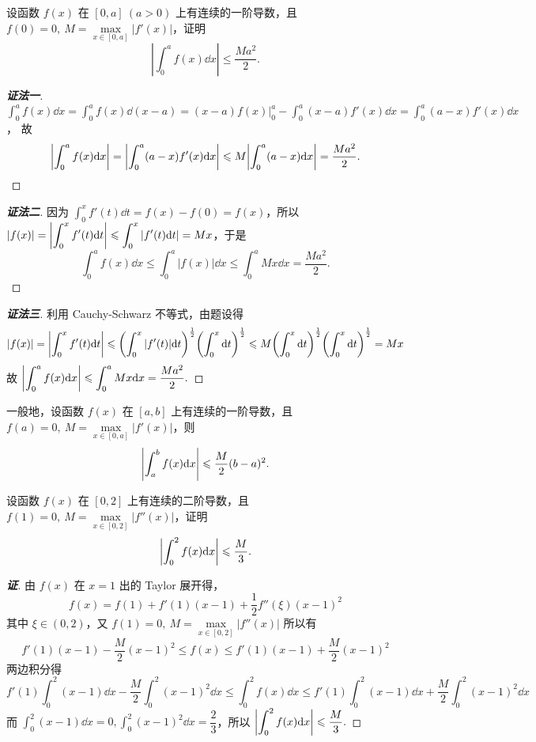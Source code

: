 \begin{example}
    设函数 $f(x)$ 在 $[0,a]~(a>0)$ 上有连续的一阶导数，且 $f(0)=0,~M=\max\limits_{x\in[0,a]}|f'(x)|$，证明 $$\displaystyle\left|\int_{0}^{a}f(x)\dd x \right|\leqslant \dfrac{Ma^2}{2}.$$
\end{example}
\begin{proof}[{\songti \textbf{证法一}}]
    $\displaystyle \int_{0}^{a}f(x)\dd x=\int_{0}^{a}f(x)\dd (x-a)=(x-a)f(x)\bigg |_0^a-\int_{0}^{a}(x-a)f'(x)\dd x=\int_{0}^{a}(a-x)f'(x)\dd x$，
    故 $$\displaystyle \qty|\int_{0}^{a}f(x)\dd x|=\qty|\int_{0}^{a}(a-x)f'(x)\dd x|\leqslant M\qty|\int_{0}^{a}(a-x)\dd x|=\dfrac{Ma^2}{2}.$$
\end{proof}
\begin{proof}[{\songti \textbf{证法二}}]
    因为 $\displaystyle\int_{0}^{x}f'(t)\dd t=f(x)-f(0)=f(x)$，所以
    $\displaystyle |f(x)|=\qty|\int_{0}^{x}f'(t)\dd t |\leqslant \int_{0}^{x}|f'(t)\dd t |=Mx$，于是
    $$\displaystyle\int_{0}^{a}f(x)\dd x\leqslant \int_{0}^{a}|f(x) |\dd x\leqslant \int_{0}^{a}Mx\dd x=\dfrac{Ma^2}{2}.$$
\end{proof}
\begin{proof}[{\songti \textbf{证法三}}]
    利用 Cauchy-Schwarz 不等式，由题设得
    $$|f(x) |=\qty|\int_{0}^{x}f'(t)\dd t |\leqslant \qty(\int_{0}^{x}|f'(t)|\dd t)^{\frac{1}{2}}\qty(\int_{0}^{x}\dd t)^{\frac{1}{2}}\leqslant M\qty(\int_{0}^{x}\dd t)^{\frac{1}{2}}\qty(\int_{0}^{x}\dd t)^{\frac{1}{2}}=Mx$$
    故 $\displaystyle \qty|\int_{0}^{a}f(x)\dd x |\leqslant \int_{0}^{a}Mx\dd x=\dfrac{Ma^2}{2}.$
\end{proof}
\begin{inference}
    一般地，设函数 $f(x)$ 在 $[a,b]$ 上有连续的一阶导数，且 $f(a)=0,~M=\max\limits_{x\in[0,a]}|f'(x)|$，则
    $$\displaystyle\qty|\int_{a}^{b}f(x)\dd x |\leqslant \dfrac{M}{2}(b-a)^2.$$
\end{inference}

\begin{example}
    设函数 $f(x)$ 在 $[0,2]$ 上有连续的二阶导数，且 $f(1)=0,~M=\max\limits_{x\in[0,2]}|f''(x)|$，证明
    $$\qty|\int_{0}^{2}f(x)\dd x|\leqslant \dfrac{M}{3}.$$
\end{example}
\begin{proof}[{\songti \textbf{证}}]
    由 $f(x)$ 在 $x=1$ 出的 Taylor 展开得，
    $$f(x)=f(1)+f'(1)(x-1)+\dfrac{1}{2}f''(\xi)(x-1)^2$$
    其中 $\xi\in(0,2)$，又 $f(1)=0,~M=\max\limits_{x\in[0,2]}|f''(x)|$ 所以有
    $$f'(1)(x-1)-\dfrac{M}{2}(x-1)^2\leqslant f(x)\leqslant f'(1)(x-1)+\dfrac{M}{2}(x-1)^2$$
    两边积分得 $$f'(1)\int_{0}^{2}(x-1)\dd x-\dfrac{M}{2}\int_{0}^{2}(x-1)^2\dd x\leqslant \int_{0}^{2}f(x)\dd x\leqslant f'(1)\int_{0}^{2}(x-1)\dd x+\dfrac{M}{2}\int_{0}^{2}(x-1)^2\dd x$$
    而 $\displaystyle\int_{0}^{2}(x-1)\dd x=0,\int_{0}^{2}(x-1)^2\dd x=\dfrac{2}{3}$，所以 $\displaystyle\qty|\int_{0}^{2}f(x)\dd x|\leqslant \dfrac{M}{3}.$
\end{proof}

